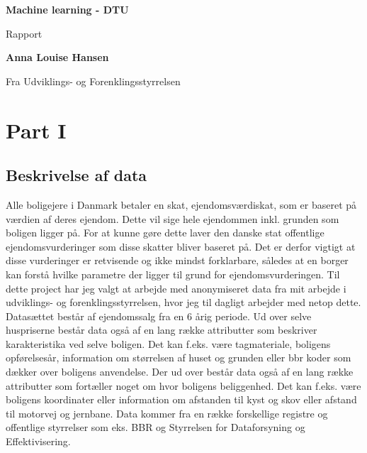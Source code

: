 \documentclass{report}
\begin{document}


\begin{titlepage}
    \begin{center}
        \vspace*{1cm}
 
        \Huge
        \textbf{Machine learning - DTU}
 
        \vspace{0.5cm}
        \LARGE
        Rapport 
 
        \vspace{1.5cm}
 
        \textbf{Anna Louise Hansen}
        \vfill
 
        Fra Udviklings- og Forenklingsstyrrelsen
 
        \vspace{0.8cm}
 
    \end{center}
\end{titlepage}



\chapter{Part I}

\section{Beskrivelse af data}
Alle boligejere i Danmark betaler en skat, ejendomsværdiskat, som er baseret på værdien af deres ejendom. Dette vil sige hele ejendommen inkl. grunden som boligen ligger på. For at kunne gøre dette laver den danske stat offentlige ejendomsvurderinger som disse skatter bliver baseret på. 
Det er derfor vigtigt at disse vurderinger er retvisende og ikke mindst forklarbare, således at en borger kan forstå hvilke parametre der ligger til grund for ejendomsvurderingen. 
Til dette project har jeg valgt at arbejde med anonymiseret data fra mit arbejde i udviklings- og forenklingsstyrrelsen, hvor jeg til dagligt arbejder med netop dette. Datasættet består af ejendomssalg fra en 6 årig periode. Ud over selve huspriserne består data også af en lang række attributter som beskriver karakteristika ved selve boligen. Det kan f.eks. være tagmateriale, boligens opførelsesår, information om størrelsen af huset og grunden eller bbr koder som dækker over boligens anvendelse. 
Der ud over består data også af en lang række attributter som fortæller noget om hvor boligens beliggenhed. Det kan f.eks. være boligens koordinater eller information om afstanden til kyst og skov eller afstand til motorvej og jernbane. 
Data kommer fra en række forskellige registre og offentlige styrrelser som eks. BBR og Styrrelsen for Dataforsyning og Effektivisering.
\end{document}
